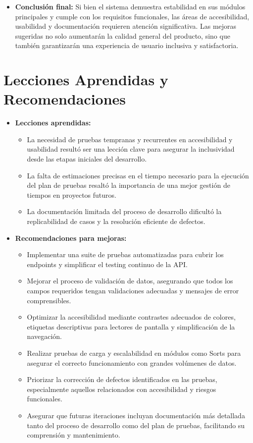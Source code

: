 \documentclass[stu, 12pt, letterpaper, donotrepeattitle, floatsintext, natbib]{apa7}
\begin{document}
\begin{itemize}
    \item \textbf{Conclusión final:} Si bien el sistema demuestra estabilidad en sus m\'odulos principales y cumple con los requisitos funcionales, las \'areas de accesibilidad, usabilidad y documentaci\'on requieren atenci\'on significativa. Las mejoras sugeridas no solo aumentar\'an la calidad general del producto, sino que tambi\'en garantizar\'an una experiencia de usuario inclusiva y satisfactoria.
\end{itemize}

\section{Lecciones Aprendidas y Recomendaciones}

\begin{itemize}
    \item \textbf{Lecciones aprendidas:}
    \begin{itemize}
        \item La necesidad de pruebas tempranas y recurrentes en accesibilidad y usabilidad result\'o ser una lecci\'on clave para asegurar la inclusividad desde las etapas iniciales del desarrollo.
        \item La falta de estimaciones precisas en el tiempo necesario para la ejecuci\'on del plan de pruebas resalt\'o la importancia de una mejor gesti\'on de tiempos en proyectos futuros.
        \item La documentaci\'on limitada del proceso de desarrollo dificult\'o la replicabilidad de casos y la resoluci\'on eficiente de defectos.
    \end{itemize}

    \item \textbf{Recomendaciones para mejoras:}
    \begin{itemize}
        \item Implementar una suite de pruebas automatizadas para cubrir los endpoints y simplificar el testing continuo de la API.
        \item Mejorar el proceso de validaci\'on de datos, asegurando que todos los campos requeridos tengan validaciones adecuadas y mensajes de error comprensibles.
        \item Optimizar la accesibilidad mediante contrastes adecuados de colores, etiquetas descriptivas para lectores de pantalla y simplificaci\'on de la navegaci\'on.
        \item Realizar pruebas de carga y escalabilidad en m\'odulos como Sorts para asegurar el correcto funcionamiento con grandes vol\'umenes de datos.
        \item Priorizar la correcci\'on de defectos identificados en las pruebas, especialmente aquellos relacionados con accesibilidad y riesgos funcionales.
        \item Asegurar que futuras iteraciones incluyan documentaci\'on m\'as detallada tanto del proceso de desarrollo como del plan de pruebas, facilitando su comprensi\'on y mantenimiento.
    \end{itemize}
\end{itemize}
\end{document}
